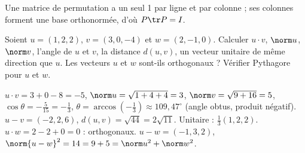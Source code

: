 \begin{qcm}
\begin{question}[plusieurs]
\begin{explication}
Une matrice de permutation a un seul 1 par ligne et par colonne ; ses colonnes forment une base orthonormée, d'où $P\tr P=I$.
\end{explication}
\end{question}
\end{qcm}

\begin{exo}
Soient $u=(1,2,2)$, $v=(3,0,-4)$ et $w=(2,-1,0)$. Calculer $u\cdot v$, $\norm u$, $\norm v$, l'angle de $u$ et $v$, la distance $d(u,v)$, un vecteur unitaire de même direction que $u$. Les vecteurs $u$ et $w$ sont-ils orthogonaux ? Vérifier Pythagore pour $u$ et $w$.
\begin{corrige}
$u\cdot v=3+0-8=-5$, $\norm u=\sqrt{1+4+4}=3$, $\norm v=\sqrt{9+16}=5$, $\cos\theta=-\frac5{15}=-\frac13$, $\theta=\arccos(-\frac13)\approx109{,}47^\circ$ (angle obtus, produit négatif). $u-v=(-2,2,6)$, $d(u,v)=\sqrt{44}=2\sqrt{11}$. Unitaire : $\frac13(1,2,2)$. $u\cdot w=2-2+0=0$ : orthogonaux. $u-w=(-1,3,2)$, $\norm{u-w}^2=14=9+5=\norm u^2+\norm w^2$.
\end{corrige}
\end{exo}
